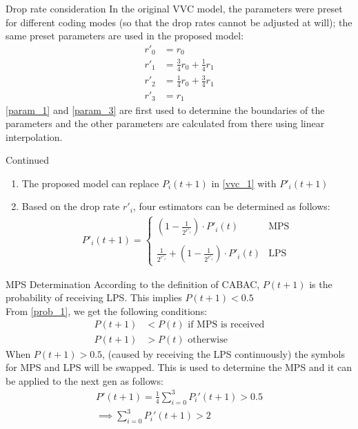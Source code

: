 \documentclass{beamer}
\providecommand{\brak}[1]{\ensuremath{\left(#1\right)}}
\begin{document}
\begin{frame}{Drop rate consideration}
    In the original VVC model, the parameters were preset for different coding modes (so that the drop rates cannot be adjusted at will); the same preset parameters are used in the proposed model: 
    \begin{align}
        r'_0 &= r_0\label{param_1}\\
        r'_1 &= \frac{3}{4}r_0 + \frac{1}{4}r_1\\
        r'_2 &= \frac{1}{4}r_0 + \frac{3}{4}r_1\\
        r'_3 &= r_1\label{param_3}
    \end{align}
    \eqref{param_1} and \eqref{param_3} are first used to determine the boundaries of the parameters and the other parameters are calculated from there using linear interpolation.\\

\end{frame}
\begin{frame}{Continued}
\begin{enumerate}[]
    \item The proposed model can replace $P_i(t+1)$ in \eqref{vvc_1} with $P'_i(t+1)$\\
    \item Based on the drop rate $r'_i$, four estimators can be determined as follows:
    \begin{align}
        P'_i(t+1)=
        \begin{cases}
            \brak{1-\frac{1}{2^{r'_i}}}\cdot P'_i(t) & \text{MPS}\\\\
            \frac{1}{2^{r'_i}} + \brak{1-\frac{1}{2^{r'_i}}}\cdot P'_i(t)&\text{LPS}
        \end{cases}
    \end{align}
    \end{enumerate}
\end{frame}
\begin{frame}{MPS Determination}
    According to the definition of CABAC, $P(t+1)$ is the probability of receiving LPS. 
    This implies $P(t+1)<0.5$\\
    From \eqref{prob_1}, we get the following conditions:
    \begin{align}
        P(t+1)&<P(t) \text{ if MPS is received}\\
        P(t+1)&>P(t) \text{ otherwise}
    \end{align}
    When $P(t+1)>0.5$, (caused by receiving the LPS continuously) the symbols for MPS and LPS will be swapped.
    This is used to determine the MPS and it can be applied to the next gen as follows:
    \begin{align}
        P'(t+1) = \frac{1}{4}\sum_{i=0}^{3} P_i'(t+1)>0.5\\
        \implies \sum_{i=0}^{3} P_i'(t+1)>2\label{dec_val}
    \end{align}
\end{frame}
\end{document}
